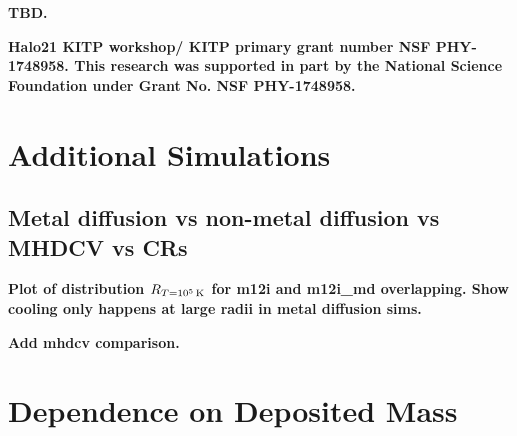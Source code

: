 \documentclass[fleqn,usenatbib]{mnras}
\newcommand{\Rcon}{R_{T=10^5\,{\rm K}}}
\begin{document}
\textbf{TBD.}

\textbf{Halo21 KITP workshop/ KITP primary grant number NSF PHY-1748958.
This research was supported in part by the National Science Foundation under Grant No. NSF PHY-1748958.
}










\appendix

\section{Additional Simulations}

\subsection{Metal diffusion vs non-metal diffusion vs MHDCV vs CRs}

\textbf{Plot of distribution $\Rcon$ for m12i and m12i\_md overlapping. Show cooling only happens at large radii in metal diffusion sims.}

\textbf{Add mhdcv comparison.}

\section{Dependence on Deposited Mass}
\end{document}
